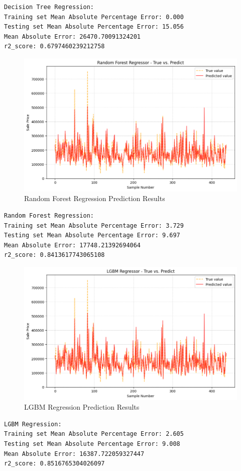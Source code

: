 \documentclass[a4paper,12pt]{article}
\begin{document}
\begin{lstlisting}
Decision Tree Regression:
Training set Mean Absolute Percentage Error: 0.000
Testing set Mean Absolute Percentage Error: 15.056
Mean Absolute Error: 26470.70091324201
r2_score: 0.6797460239212758
\end{lstlisting}

\begin{figure}[H]
    \centering
    \includegraphics[width=0.75\linewidth]{images/kaggle_RandomForests.png}
    \caption{Random Forest Regression Prediction Results}
\end{figure}

\begin{lstlisting}
Random Forest Regression:
Training set Mean Absolute Percentage Error: 3.729
Testing set Mean Absolute Percentage Error: 9.697
Mean Absolute Error: 17748.21392694064
r2_score: 0.8413617743065108
\end{lstlisting}

\begin{figure}[H]
    \centering
    \includegraphics[width=0.75\linewidth]{images/kaggle_LGBM.png}
    \caption{LGBM Regression Prediction Results}
\end{figure}

\begin{lstlisting}
LGBM Regression:
Training set Mean Absolute Percentage Error: 2.605
Testing set Mean Absolute Percentage Error: 9.008
Mean Absolute Error: 16387.722059327447
r2_score: 0.8516765304026097
\end{lstlisting}
\end{document}
